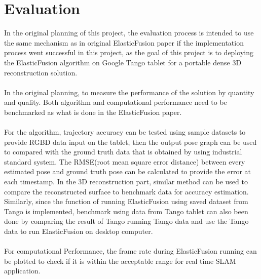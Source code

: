 \documentclass[12pt,twoside]{article}
\begin{document}
\section{Evaluation}
In the original planning of this project, the evaluation process is intended to use the same mechanism as in original ElasticFusion\citep{whelan2016elasticfusion} paper if the implementation process went successful in this project, as the goal of this project is to deploying the ElasticFusion algorithm on Google Tango tablet for a portable dense 3D reconstruction solution.\\
\\
In the original planning, to measure the performance of the solution by quantity and quality. Both algorithm and computational performance need to be benchmarked as what is done in the ElasticFusion\citep{whelan2016elasticfusion} paper.\\
\\
For the algorithm, trajectory accuracy can be tested using sample datasets to provide RGBD data input on the tablet, then the output pose graph can be used to compared with the ground truth data that is obtained by using industrial standard system. The RMSE(root mean square error distance) between every estimated pose and ground truth pose can be calculated to provide the error at each timestamp. In the 3D reconstruction part, similar method can be used to compare the reconstructed surface to benchmark data for accuracy estimation. Similarly, since the function of running ElasticFusion using saved dataset from Tango is implemented, benchmark using data from Tango tablet can also been done by comparing the result of Tango running Tango data and use the Tango data to run ElasticFusion on desktop computer.\\
\\
For computational Performance, the frame rate during ElasticFusion running can be plotted to check if it is within the acceptable range for real time SLAM application.\\
\\
\end{document}
